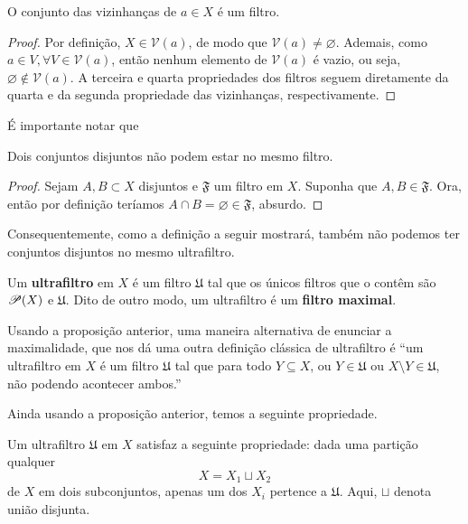  \begin{proposition}
 O conjunto das vizinhanças de $a\in X$ é um filtro.
 \end{proposition}
 
 \begin{proof}
 Por definição, 
 $X \in \mathcal{V}(a)$,
 de modo que 
 $\mathcal{V}(a) \neq \varnothing$.
 Ademais, como
 $a\in V, \forall V \in \mathcal{V}(a)$,
 então nenhum elemento de 
 $\mathcal{V}(a)$
 é vazio, ou seja,
 $\varnothing \notin \mathcal{V}(a)$.
 A terceira e quarta propriedades dos filtros seguem
 diretamente da quarta e da segunda propriedade das
 vizinhanças, respectivamente.
 \end{proof}
 
 É importante notar que
 
 \begin{proposition}
 Dois conjuntos disjuntos não podem estar
 no mesmo filtro.
 \end{proposition}
 
 \begin{proof}
 Sejam 
 $A, B \subset X$
 disjuntos e
 $\mathfrak{F}$
 um filtro em 
 $X$.
 Suponha que
 $A, B \in \mathfrak{F}$.
 Ora, então por definição teríamos
 $A \cap B = \varnothing \in \mathfrak{F}$,
 absurdo.
 \end{proof}
 
 Consequentemente, como a definição a seguir mostrará,
 também não podemos ter conjuntos disjuntos no mesmo
 ultrafiltro.
 
 \begin{definition}[Ultrafiltro]
 Um \textbf{ultrafiltro} em
 $X$
 é um filtro
 $\mathfrak{U}$
 tal que os únicos filtros que o contêm são
 ${\mathscr{P}({X})}$
 e
 $\mathfrak{U}$.
 Dito de outro modo, um ultrafiltro é
 um \textbf{filtro maximal}.
 \end{definition}
 
 Usando a proposição anterior,
 uma maneira alternativa de enunciar a maximalidade,
 que nos dá uma outra definição clássica de ultrafiltro é
 ``um ultrafiltro em 
 $X$
 é um filtro
 $\mathfrak{U}$
 tal que para todo
 $Y \subseteq X$,
 ou
 $Y \in \mathfrak{U}$
 ou
 $X \setminus Y \in \mathfrak{U}$,
 não podendo acontecer ambos.''
 
 Ainda usando a proposição anterior, 
 temos a seguinte propriedade.
 
 \begin{proposition}
 Um ultrafiltro
 $\mathfrak{U}$
 em 
 $X$
 satisfaz a seguinte propriedade:
 dada uma partição qualquer
 \begin{equation*}
    X = X_1 \sqcup X_2
 \end{equation*}
 de $X$ em dois subconjuntos, 
 apenas um dos $X_i$ pertence a $\mathfrak{U}$. 
 Aqui,
 $\sqcup$
 denota união disjunta.
 \end{proposition}
 
